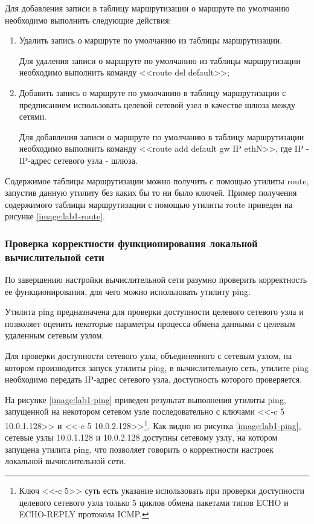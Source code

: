 \begin{enumerate}
		Для добавления записи в таблицу маршрутизации о маршруте по умолчанию необходимо выполнить следующие действия:

		\begin{enumerate}

			\item Удалить запись о маршруте по умолчанию из таблицы маршрутизации.

			Для удаления записи о маршруте по умолчанию из таблицы маршрутизации необходимо выполнить команду
			<<route del default>>;
			
			\item Добавить запись о маршруте по умолчанию в таблицу маршрутизации
			с предписанием использовать целевой сетевой узел в качестве шлюза между сетями.

			Для добавления записи о маршруте по умолчанию в таблицу маршрутизации необходимо выполнить команду
			<<route add default gw IP ethN>>, где IP - IP-адрес сетевого узла - шлюза.

		\end{enumerate}

		Содержимое таблицы маршрутизации можно получить с помощью утилиты route, запустив данную утилиту без каких бы то ни было ключей.
		Пример получения содержимого таблицы маршрутизации с помощью утилиты route приведен на рисунке \ref{image:lab1-route}.


	\end{enumerate}

\subsubsection{Проверка корректности функционирования локальной вычислительной сети}

	По завершению настройки вычислительной сети разумно проверить корректность ее функционирования,
	для чего можно использовать утилиту ping.
		
	Утилита ping предназначена для проверки доступности целевого сетевого узла и позволяет оценить
	некоторые параметры процесса обмена данными с целевым удаленным сетевым узлом.

	Для проверки доступности сетевого узла, объединенного с сетевым узлом, на котором производится
	запуск утилиты ping, в вычислительную сеть, утилите ping необходимо передать IP-адрес сетевого узла,
	доступность которого проверяется.

	На рисунке \ref{image:lab1-ping} приведен результат выполнения утилиты ping,
	запущенной на некотором сетевом узле последовательно с ключами <<-c 5 10.0.1.128>> и
	<<-c 5 10.0.2.128>>\footnote{Ключ <<-c 5>> суть есть указание использовать при проверки доступности
	целевого сетевого узла только 5 циклов обмена пакетами типов ECHO и ECHO-REPLY протокола ICMP.}.
	Как видно из рисунка \ref{image:lab1-ping}, сетевые узлы 10.0.1.128 и 10.0.2.128 доступны сетевому узлу, на котором запущена утилита ping,
	что позволяет говорить о корректности настроек локальной вычислительной сети.


